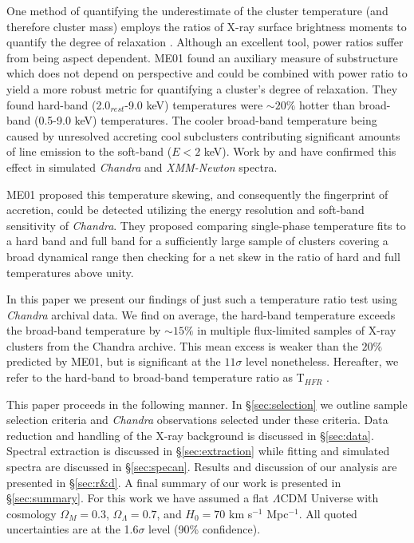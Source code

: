 \documentclass{emulateapj}
\newcommand{\tf}{T$_{HFR}$ }
\begin{document}
One method of quantifying the underestimate of the cluster temperature
(and therefore cluster mass) employs the ratios of X-ray surface
brightness moments to quantify the degree of relaxation
\citep{1995ApJ...452..522B, 1996ApJ...458...27B,
2005ApJ...624..606J}. Although an excellent tool, power ratios suffer
from being aspect dependent. ME01 found an auxiliary measure of
substructure which does not depend on perspective and could be
combined with power ratio to yield a more robust metric for
quantifying a cluster's degree of relaxation. They found hard-band
(2.0$_{rest}$-9.0 keV) temperatures were $\sim 20\%$ hotter than
broad-band (0.5-9.0 keV) temperatures. The cooler broad-band
temperature being caused by unresolved accreting cool subclusters
contributing significant amounts of line emission to the
soft-band ($E<2$ keV). Work by \cite{2004MNRAS.354...10M} and
\cite{2006ApJ...640..710V} have confirmed this effect in simulated
{\textit{Chandra}} and {\textit{XMM-Newton}} spectra.

ME01 proposed this temperature skewing, and consequently the fingerprint of
accretion, could be detected utilizing the energy resolution and
soft-band sensitivity of {\textit{Chandra}}. They proposed comparing
single-phase temperature fits to a hard band and full band for a
sufficiently large sample of clusters covering a broad dynamical range
then checking for a net skew in the ratio of hard and full
temperatures above unity.

In this paper we present our findings of just such a temperature ratio
test using {\textit{Chandra}} archival data. We find on average, the
hard-band temperature exceeds the broad-band temperature by $\sim15\%$
in multiple flux-limited samples of X-ray clusters from the Chandra
archive. This mean excess is weaker than the $20\%$
predicted by ME01, but is significant at the $11\sigma$ level
nonetheless. Hereafter, we refer to the hard-band to broad-band
temperature ratio as \tf. 

This paper proceeds in the following manner. In \S\ref{sec:selection}
we outline sample selection criteria and {\textit{Chandra}}
observations selected under these criteria. Data reduction and
handling of the X-ray background is discussed in
\S\ref{sec:data}. Spectral extraction is discussed in
\S\ref{sec:extraction} while fitting and simulated spectra are
discussed in \S\ref{sec:specan}. Results and discussion of our
analysis are presented in \S\ref{sec:r&d}. A final summary of our work
is presented in \S\ref{sec:summary}. For this work we have assumed a
flat $\Lambda$CDM Universe with cosmology $\Omega_{M} = 0.3$,
$\Omega_{\Lambda} = 0.7$, and $H_{0} = 70$ km s$^{-1}$ Mpc$^{-1}$. All
quoted uncertainties are at the 1.6$\sigma$ level (90\% confidence).
\end{document}
